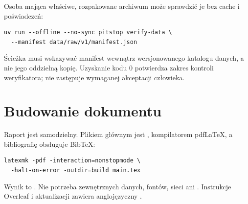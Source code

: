 Osoba mająca właściwe, rozpakowane archiwum może sprawdzić je bez
cache i poświadczeń:
\begin{lstlisting}
uv run --offline --no-sync pitstop verify-data \
  --manifest data/raw/v1/manifest.json
\end{lstlisting}
Ścieżka musi wskazywać manifest wewnątrz wersjonowanego katalogu danych,
a nie jego oddzielną kopię. Uzyskanie kodu 0 potwierdza zakres kontroli
weryfikatora; nie zastępuje wymaganej akceptacji człowieka.

\section{Budowanie dokumentu}

Raport jest samodzielny. Plikiem głównym jest ,
kompilatorem pdfLaTeX, a bibliografię obsługuje BibTeX:
\begin{lstlisting}
latexmk -pdf -interaction=nonstopmode \
  -halt-on-error -outdir=build main.tex
\end{lstlisting}
Wynik to . Nie potrzeba zewnętrznych danych,
fontów, sieci ani . Instrukcje Overleaf i aktualizacji
zawiera anglojęzyczny \code{README.md}.
